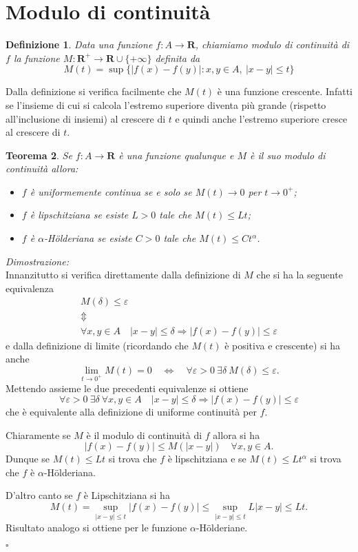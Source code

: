 \documentclass[italian,a4paper]{article}
\newcommand{\R}{\mathbf{R}}
\renewcommand{\epsilon}{\varepsilon}
\newtheorem{theorem}{Teorema}
\newtheorem{definition}[theorem]{Definizione}
\newenvironment{proof}
        {%
                {}%
                {%
                }%
        \noindent%
        {\it Dimostrazione:}\\%
        }%
        {%
        \hfill$\square$%
        }
\begin{document}
\section{Modulo di continuit\`a}

\begin{definition}
Data una funzione $f\colon A\to \R$, chiamiamo \emph{modulo di
continuit\`a} di $f$ la funzione $M\colon \R^+\to \R\cup\{+\infty\}$
definita da
\[
	M(t)=\sup \{ \vert f(x)-f(y)\vert\colon x,y\in A,\ \vert
	x-y\vert \le t\}
\]
\end{definition}

Dalla definizione si verifica facilmente che $M(t)$ \`e una funzione
crescente. Infatti se l'insieme di cui si calcola l'estremo superiore
diventa pi\`u grande (rispetto all'inclusione di insiemi) al crescere
di $t$ e quindi anche l'estremo superiore cresce al crescere di $t$.

\begin{theorem}
Se $f\colon A\to\R$ \`e una funzione qualunque e $M$ \`e il suo modulo
di continuit\`a allora:
\begin{itemize}
\item
$f$ \`e uniformemente continua se e solo se $M(t)\to 0$ per $t\to
0^+$;
\item
$f$ \`e lipschitziana se esiste $L>0$ tale che $M(t)\le Lt$;
\item
$f$ \`e $\alpha$-H\"o{}lderiana se esiste $C>0$ tale che $M(t)\le C t^\alpha$.
\end{itemize}
\end{theorem}
\begin{proof}
Innanzitutto si verifica direttamente dalla definizione di $M$ che si
ha la seguente equivalenza 
\begin{eqnarray*}
		&M(\delta) \le \epsilon &\\
		&\Updownarrow &\\
		&\forall x,y\in A\quad \vert x-y\vert \le \delta \Rightarrow
	\vert f(x)-f(y)\vert \le \epsilon&
\end{eqnarray*}
e dalla definizione di limite (ricordando che $M(t)$ \`e positiva e
crescente) si ha anche
\[
	\lim_{t\to 0^+} M(t) = 0
	\quad \Leftrightarrow \quad
	\forall \epsilon>0\  \exists \delta\ M(\delta)\le \epsilon.
\]
Mettendo assieme le due precedenti equivalenze si ottiene
\[
	\forall \epsilon>0\ \exists \delta\ \forall x,y\in A\quad
	\vert x-y\vert \le \delta \Rightarrow \vert f(x)-f(y)\vert \le
	\epsilon 
\]
che \`e equivalente alla definizione di uniforme continuit\`a per $f$.

Chiaramente se $M$ \`e il modulo di continuit\`a di $f$ allora
si ha
\[
	\vert f(x)-f(y)\vert \le M(\vert x-y\vert)\quad \forall x,y\in A.
\]
Dunque se $M(t)\le Lt$ si trova che $f$ \`e lipschitziana e se
$M(t)\le Lt^\alpha$ si trova che $f$ \`e $\alpha$-H\"o{}lderiana.

D'altro canto se $f$ \`e Lipschitziana si ha 
\[
	M(t)=\sup_{\vert x-y\vert \le t} \vert f(x)-f(y)\vert
	\le \sup_{\vert x-y\vert \le t} L \vert x-y\vert
	\le Lt.
\]
Risultato analogo si ottiene per le funzione $\alpha$-H\"o{}lderiane.

\end{proof}
\end{document}
